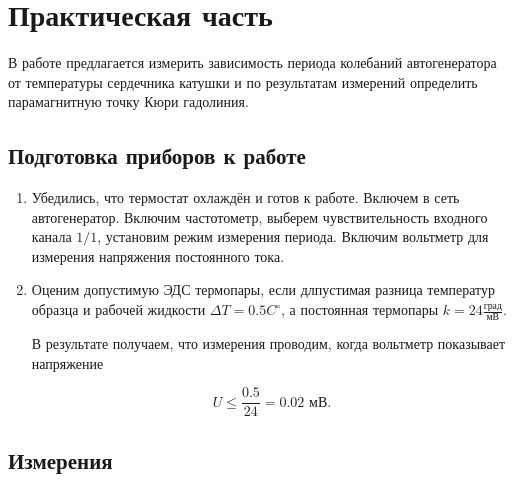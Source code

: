 \documentclass[a4paper,12pt]{article} %
\begin{document}
\section{Практическая часть}

В работе предлагается измерить зависимость периода колебаний автогенератора от температуры сердечника катушки и по результатам измерений определить парамагнитную точку Кюри гадолиния.

\subsection{Подготовка приборов к работе}

\begin{enumerate}
    \item Убедились, что термостат охлаждён и готов к работе. Включем в сеть автогенератор. Включим частотометр, выберем чувствительность входного канала $1/1$, установим режим измерения периода. Включим вольтметр для измерения напряжения постоянного тока.
    \item Оценим допустимую ЭДС термопары, если длпустимая разница температур образца и рабочей жидкости $\Delta T = 0.5 C^{\circ}$, а постоянная термопары $k = 24 \frac{\text{град}}{\text{мВ}}$. 
    
    В результате получаем, что измерения проводим, когда вольтметр показывает напряжение 
    
    \[U \leq \frac{0.5}{24} = 0.02 \text{ мВ}.\]
    
\end{enumerate}

\subsection{Измерения}
\end{document}
